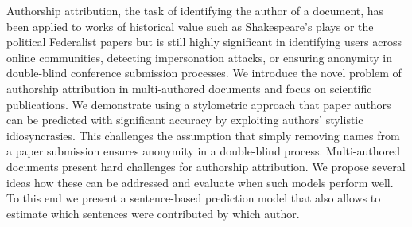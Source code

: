 Authorship attribution, the task of identifying the author of a document, has been applied to works of historical value such as Shakespeare's plays or the political Federalist papers but is still highly significant in identifying users across online communities, detecting impersonation attacks, or ensuring anonymity in double-blind conference submission processes.
We introduce the novel problem of authorship attribution in multi-authored documents and focus on scientific publications.
We demonstrate using a stylometric approach that paper authors can be predicted with significant accuracy by exploiting authors' stylistic idiosyncrasies.
This challenges the assumption that simply removing names from a paper submission ensures anonymity in a double-blind process.
Multi-authored documents present hard challenges for authorship attribution.
We propose several ideas how these can be addressed and evaluate when such models perform well.
To this end we present a sentence-based prediction model that also allows to estimate which sentences were contributed by which author.
